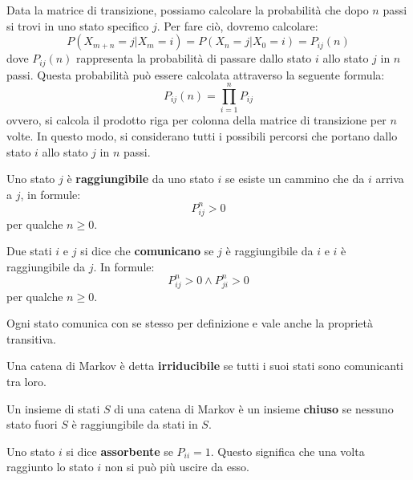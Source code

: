 Data la matrice di transizione, possiamo calcolare la probabilità che dopo $n$
passi si trovi in uno stato specifico $j$. Per fare ciò, dovremo calcolare:
\begin{equation}
    P(X_{m + n} = j | X_{m} = i) = P(X_n = j | X_0 = i)=P_{ij}(n)
\end{equation}
dove $P_{ij}(n)$ rappresenta la probabilità di passare dallo stato $i$ allo stato
$j$ in $n$ passi. Questa probabilità può essere calcolata attraverso la seguente
formula:
\begin{equation}
    P_{ij}(n) = \prod_{i = 1}^{n} P_{ij}
\end{equation}
ovvero, si calcola il prodotto riga per colonna della matrice di transizione
per $n$ volte. In questo modo, si considerano tutti i possibili percorsi che
portano dallo stato $i$ allo stato $j$ in $n$ passi.
\begin{definizione}
    Uno stato $j$ è \textbf{raggiungibile} da uno stato $i$ se esiste un cammino
    che da $i$ arriva a $j$, in formule:
    \begin{equation*}
        P^n_{ij}>0
    \end{equation*}
    per qualche $n\geq 0$.
\end{definizione}
\begin{definizione}
    Due stati $i$ e $j$ si dice che \textbf{comunicano} se $j$ è raggiungibile
    da $i$ e $i$ è raggiungibile da $j$. In formule:
    \begin{equation*}
        P^n_{ij}>0 \land P^n_{ji}>0
    \end{equation*}
    per qualche $n\geq 0$.
\end{definizione}
\begin{nota}
    Ogni stato comunica con se stesso per definizione e vale anche la proprietà
    transitiva.
\end{nota}
\begin{definizione}
    Una catena di Markov è detta \textbf{irriducibile} se tutti i suoi stati sono
    comunicanti tra loro.
\end{definizione}
\begin{definizione}
    Un insieme di stati $S$ di una catena di Markov è un insieme \textbf{chiuso}
    se nessuno stato fuori $S$ è raggiungibile da stati in $S$.
\end{definizione}
\begin{definizione}
    Uno stato $i$ si dice \textbf{assorbente} se $P_{ii} = 1$. Questo significa
    che una volta raggiunto lo stato $i$ non si può più uscire da esso.
\end{definizione}
